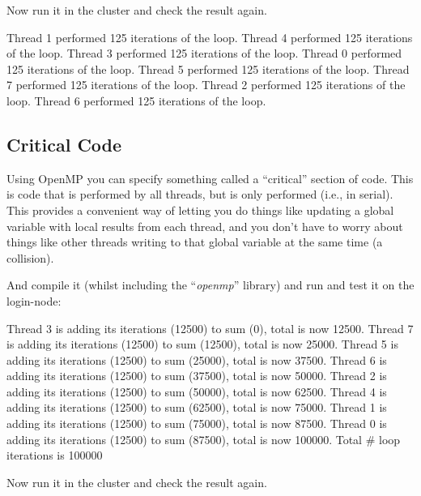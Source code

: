 Now run it in the cluster and check the result again.

\begin{prompt}
Thread 1 performed 125 iterations of the loop.
Thread 4 performed 125 iterations of the loop.
Thread 3 performed 125 iterations of the loop.
Thread 0 performed 125 iterations of the loop.
Thread 5 performed 125 iterations of the loop.
Thread 7 performed 125 iterations of the loop.
Thread 2 performed 125 iterations of the loop.
Thread 6 performed 125 iterations of the loop.
\end{prompt}

\subsection{Critical Code}

Using OpenMP you can specify something called a ``critical'' section of code.
This is code that is performed by all threads, but is only performed
 (i.e., in serial). This provides a convenient way
of letting you do things like updating a global variable with local results
from each thread, and you don't have to worry about things like other threads
writing to that global variable at the same time (a collision).


And compile it (whilst including the ``\emph{openmp}'' library) and run and test it on the login-node:

\begin{prompt}
Thread 3 is adding its iterations (12500) to sum (0), total is now 12500.
Thread 7 is adding its iterations (12500) to sum (12500), total is now 25000.
Thread 5 is adding its iterations (12500) to sum (25000), total is now 37500.
Thread 6 is adding its iterations (12500) to sum (37500), total is now 50000.
Thread 2 is adding its iterations (12500) to sum (50000), total is now 62500.
Thread 4 is adding its iterations (12500) to sum (62500), total is now 75000.
Thread 1 is adding its iterations (12500) to sum (75000), total is now 87500.
Thread 0 is adding its iterations (12500) to sum (87500), total is now 100000.
Total # loop iterations is 100000
\end{prompt}

Now run it in the cluster and check the result again.

